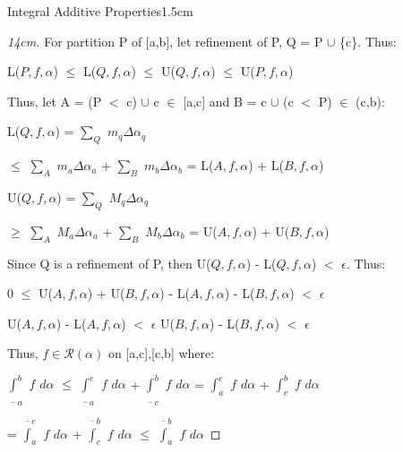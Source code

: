 \begin{ltheorem}{Integral Additive Properties}{1.5cm}
\begin{proof}[14cm]
            For partition P of [a,b], let refinement of P, Q = P $\cup$ \{c\}.
            Thus:

            \hspace{0.5cm}
            L($P,f,\alpha$)
            $\leq$ L($Q,f,\alpha$)
            $\leq$ U($Q,f,\alpha$)
            $\leq$ U($P,f,\alpha$)

            Thus, let A = (P $<$ c) $\cup$ c $\in$ [a,c]
            and B = c $\cup$ (c $<$ P) $\in$ (c,b):  

            \hspace{0.5cm}
            L($Q,f,\alpha$)
            = $\sum_Q$ $m_q \Delta \alpha_q$

            \hspace{2.4cm}
            $\leq$ $\sum_A$ $m_a \Delta \alpha_a$ + $\sum_B$ $m_b \Delta \alpha_b$
            = L($A,f,\alpha$) + L($B,f,\alpha$)

            \hspace{0.5cm}
            U($Q,f,\alpha$)
            = $\sum_Q$ $M_q \Delta \alpha_q$

            \hspace{2.4cm}
            $\geq$ $\sum_A$ $M_a \Delta \alpha_a$ + $\sum_B$ $M_b \Delta \alpha_b$
            = U($A,f,\alpha$) + U($B,f,\alpha$)

            Since Q is a refinement of P, then
            U($Q,f,\alpha$) - L($Q,f,\alpha$) $<$ $\epsilon$. Thus:

            \hspace{0.5cm}
            0 $\leq$ U($A,f,\alpha$) + U($B,f,\alpha$)
            - L($A,f,\alpha$) - L($B,f,\alpha$) $<$ $\epsilon$

            \hspace{0.5cm}
            U($A,f,\alpha$) - L($A,f,\alpha$) $<$ $\epsilon$
            \hspace{1cm}
            U($B,f,\alpha$) - L($B,f,\alpha$) $<$ $\epsilon$

            Thus, $f \in \mathscr{R}(\alpha)$ on [a,c],[c,b] where:

            \hspace{0.5cm}
            $\underline{\int}_a^b$ $f$ $d\alpha$
            $\leq$ $\underline{\int}_a^c$ $f$ $d\alpha$
            + $\underline{\int}_c^b$ $f$ $d\alpha$
            = $\int_a^c$ $f$ $d\alpha$ + $\int_c^b$ $f$ $d\alpha$
            
            \hspace{2.1cm}
            = $\overline{\int}_a^c$ $f$ $d\alpha$
            + $\overline{\int}_c^b$ $f$ $d\alpha$
            $\leq$ $\overline{\int}_a^b$ $f$ $d\alpha$


\end{proof}
\end{ltheorem}
